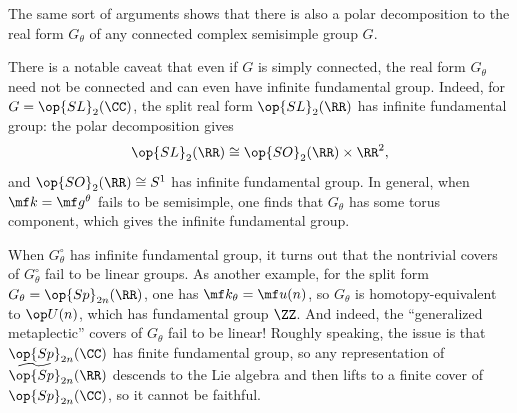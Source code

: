 \documentclass[../notes.tex]{subfiles}
\begin{document}
\begin{remark}
	The same sort of arguments shows that there is also a polar decomposition to the real form $G_\theta$ of any connected complex semisimple group $G$.
\end{remark}
\begin{example}
	There is a notable caveat that even if $G$ is simply connected, the real form $G_\theta$ need not be connected and can even have infinite fundamental group. Indeed, for $G=\op{SL}_2(\CC)$, the split real form $\op{SL}_2(\RR)$ has infinite fundamental group: the polar decomposition gives
	\[\op{SL}_2(\RR)\cong\op{SO}_2(\RR)\times\RR^2,\]
	and $\op{SO}_2(\RR)\cong S^1$ has infinite fundamental group. In general, when $\mf k=\mf g^\theta$ fails to be semisimple, one finds that $G_\theta$ has some torus component, which gives the infinite fundamental group.
\end{example}
\begin{remark} \label{rem:sp-tilde-not-linear}
	When $G_\theta^\circ$ has infinite fundamental group, it turns out that the nontrivial covers of $G_\theta^\circ$ fail to be linear groups. As another example, for the split form $G_\theta=\op{Sp}_{2n}(\RR)$, one has $\mf k_\theta=\mf u(n)$, so $G_\theta$ is homotopy-equivalent to $\op U(n)$, which has fundamental group $\ZZ$. And indeed, the ``generalized metaplectic'' covers of $G_\theta$ fail to be linear! Roughly speaking, the issue is that $\op{Sp}_{2n}(\CC)$ has finite fundamental group, so any representation of $\widetilde{\op{Sp}}_{2n}(\RR)$ descends to the Lie algebra and then lifts to a finite cover of $\op{Sp}_{2n}(\CC)$, so it cannot be faithful.
\end{remark}
\end{document}
